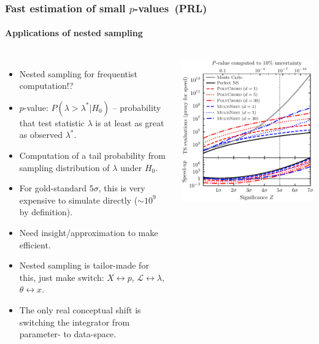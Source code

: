 \documentclass[aspectratio=169,handout]{beamer}
\begin{document}
\begin{frame}
    \frametitle{Fast estimation of small $p$-values~(PRL)}
    \framesubtitle{Applications of nested sampling}
    \begin{columns}
        \begin{itemize}
            \item Nested sampling for frequentist computation!?
            \item $p$-value: $P(\lambda>\lambda^*|H_0)$ -- probability that test statistic $\lambda$ is at least as great as observed $\lambda^*$.
            \item Computation of a tail probability from sampling distribution of $\lambda$ under $H_0$.
            \item For gold-standard $5\sigma$, this is very expensive to simulate directly ($\sim10^9$ by definition).
            \item Need insight/approximation to make efficient.
            \item Nested sampling is tailor-made for this, just make switch: $X\leftrightarrow p$, $\mathcal{L}\leftrightarrow\lambda$, $\theta \leftrightarrow x$.
            \item The only real conceptual shift is switching the integrator from parameter- to data-space.
        \end{itemize}
        \includegraphics[width=\textwidth]{figures/pvalue.pdf}
    \end{columns}
\end{frame}
\end{document}
